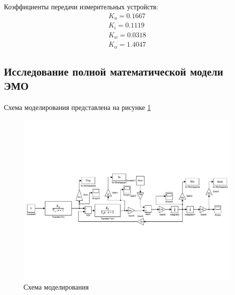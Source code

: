 \documentclass[a4paper,12pt]{article}
\begin{document}
	\noindent Коэффициенты передачи измерительных устройств:\\
	
	
	\begin{gather}
	K_u=0.1667\\
	K_i=0.1119\\
	K_w=0.0318\\
	K_\alpha=1.4047
	\end{gather}
	\newpage
	\begin{center}			
	\section{Исследование полной математической модели ЭМО}
	\end{center}
		\paragraph {} Схема моделирования представлена на рисунке \ref{s_1}
		\begin{figure}[h]
			\renewcommand{\figurename}{Рисунок}
			\centering
			\includegraphics[width=6in]{Lab10full.pdf}
			\caption{Схема моделирования}
			\label{s_1}
		\end{figure}
\end{document}
